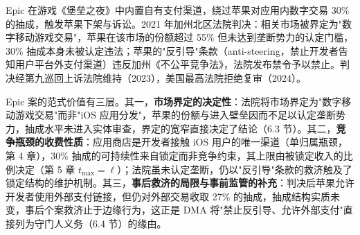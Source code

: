 \begin{case}
Epic 在游戏《堡垒之夜》中内置自有支付渠道，绕过苹果对应用内数字交易 30\% 的抽成，触发苹果下架与诉讼。2021 年加州北区法院判决：相关市场被界定为"数字移动游戏交易"，苹果在该市场的份额超过 55\% 但未达到垄断势力的认定门槛，30\% 抽成本身未被认定违法；苹果的"反引导"条款（anti-steering，禁止开发者告知用户平台外支付渠道）违反加州《不公平竞争法》，法院发布禁令予以禁止。判决经第九巡回上诉法院维持（2023），美国最高法院拒绝复审（2024）。
\end{case}

Epic 案的范式价值有三层。其一，\textbf{市场界定的决定性}：法院将市场界定为"数字移动游戏交易"而非"iOS 应用分发"，苹果的份额与进入壁垒因而不足以认定垄断势力，抽成水平未进入实体审查，界定的宽窄直接决定了结论（6.3 节）。其二，\textbf{竞争瓶颈的收费性质}：应用商店是开发者接触 iOS 用户的唯一渠道（单归属瓶颈，第 4 章），30\% 抽成的可持续性来自锁定而非竞争约束，其上限由被锁定收入的比例决定（第 5 章 $t_{\max} = \ell$）；法院虽未认定垄断，仍以"反引导"条款的救济触及了锁定结构的维护机制。其三，\textbf{事后救济的局限与事前监管的补充}：判决后苹果允许开发者使用外部支付链接，但仍对外部交易收取 27\% 的抽成，抽成结构实质未变，事后个案救济止于边缘行为，这正是 DMA 将"禁止反引导、允许外部支付"直接列为守门人义务（6.4 节）的缘由。

